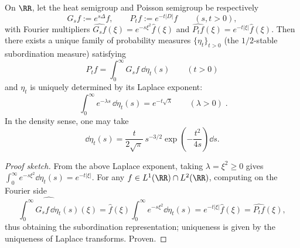 \begin{proposition}\label{prop:xi-poisson-subordination-half-stable}
On \(\RR\), let the heat semigroup and Poisson semigroup be respectively
\[
G_s f:=e^{s\Delta}f,
\qquad
P_t f:=e^{-t|D|}f
\qquad(s,t>0),
\]
with Fourier multipliers \(\widehat{G_s f}(\xi)=e^{-s\xi^2}\widehat f(\xi)\) and \(\widehat{P_t f}(\xi)=e^{-t|\xi|}\widehat f(\xi)\).
Then there exists a unique family of probability measures \(\{\eta_t\}_{t>0}\) (the \(1/2\)-stable subordination measure) satisfying
\[
\boxed{\;
P_t f=\int_{0}^{\infty} G_s f\ \dd\eta_t(s)\qquad(t>0)\;}
\]
and \(\eta_t\) is uniquely determined by its Laplace exponent:
\[
\boxed{\;
\int_{0}^{\infty}e^{-\lambda s}\,\dd\eta_t(s)=e^{-t\sqrt{\lambda}}
\qquad(\lambda>0)\; }.
\]
In the density sense, one may take
\[
\dd\eta_t(s)=\frac{t}{2\sqrt{\pi}}\,s^{-3/2}\exp\!\left(-\frac{t^2}{4s}\right)\dd s.
\]
\end{proposition}
\begin{proof}[Proof sketch]
From the above Laplace exponent, taking \(\lambda=\xi^2\ge 0\) gives
\(
\int_0^\infty e^{-s\xi^2}\dd\eta_t(s)=e^{-t|\xi|}
\).
For any \(f\in L^1(\RR)\cap L^2(\RR)\), computing on the Fourier side
\[
\widehat{\int_0^\infty G_s f\,\dd\eta_t(s)}(\xi)
=\widehat f(\xi)\int_0^\infty e^{-s\xi^2}\dd\eta_t(s)
=e^{-t|\xi|}\widehat f(\xi)
=\widehat{P_t f}(\xi),
\]
thus obtaining the subordination representation; uniqueness is given by the uniqueness of Laplace transforms. Proven.
\end{proof}

